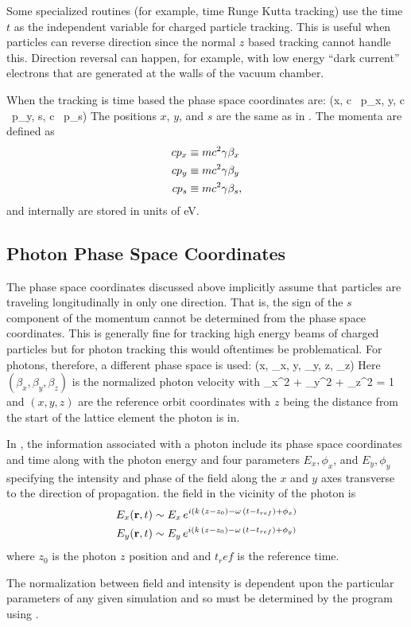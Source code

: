 Some specialized routines (for example, time Runge Kutta tracking) use
the time $t$ as the independent variable for charged particle
tracking. This is useful when particles can reverse direction since the normal
$z$ based tracking cannot handle this. Direction reversal can happen, for example,
with low energy ``dark current'' electrons that are generated at the
walls of the vacuum chamber.

When the tracking is time based the phase space coordinates are:
\Begineq
  (x, c \, p_x, y, c \, p_y, s, c \, p_s)
\Endeq
The positions $x$, $y$, and $s$ are the same as in
. The momenta are defined as
\begin{align}
c p_x &\equiv m c^2 \gamma \beta_x \nonumber \\
c p_y &\equiv m c^2 \gamma \beta_y \\
c p_s &\equiv m c^2 \gamma \beta_s, \nonumber
\end{align}
and internally are stored in units of eV.

\subsection{Photon Phase Space Coordinates}
\label{s:photon.phase.space}

The phase space coordinates discussed above implicitly assume that
particles are traveling longitudinally in only one direction. That is,
the sign of the $s$ component of the momentum cannot be determined
from the phase space coordinates. This is generally fine for tracking
high energy beams of charged particles but for photon tracking this
would oftentimes be problematical. For photons, therefore, a different
phase space is used:
\Begineq
  (x, \beta_x, y, \beta_y, z, \beta_z)
  \label{xbybzb}
\Endeq
Here $(\beta_x, \beta_y, \beta_z)$ is the normalized photon velocity with
\Begineq
  \beta_x^2 + \beta_y^2 + \beta_z^2 = 1 
  \label{bbb1}
\Endeq
and $(x, y, z)$ are the reference orbit coordinates with $z$ being the
distance from the start of the lattice element the photon is in.

In \bmad, the information associated with a photon include its phase
space coordinates and time along with the photon energy and four
parameters $E_x, \phi_x$, and $E_y, \phi_y$ specifying the intensity
and phase of the field along the $x$ and $y$ axes transverse to the
direction of propagation.  the field in the vicinity of the photon is
\begin{align}
  E_x ({\bf r}, t) &\sim E_x \, e^{i (k \, (z - z_0) - \omega \, (t - t_{ref}) + \phi_x)} \nonumber \\
  E_y ({\bf r}, t) &\sim E_y \, e^{i (k \, (z - z_0) - \omega \, (t - t_{ref}) + \phi_y)} 
  \label{ertee}
\end{align}
where $z_0$ is the photon $z$ position and and $t_ref$ is the reference time.

The normalization between field and intensity is dependent upon the
particular parameters of any given simulation and so must be
determined by the program using \bmad.

